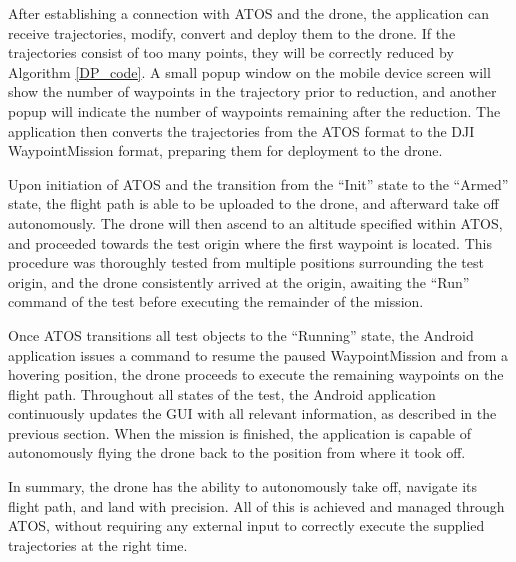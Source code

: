 After establishing a connection with ATOS and the drone, the application can receive trajectories, modify, convert and deploy them to the drone. If the trajectories consist of too many points, they will be correctly reduced by Algorithm \ref{DP_code}. A small popup window on the mobile device screen will show the number of waypoints in the trajectory prior to reduction, and another popup will indicate the number of waypoints remaining after the reduction. The application then converts the trajectories from the ATOS format to the DJI WaypointMission format, preparing them for deployment to the drone. 
\newline

Upon initiation of ATOS and the transition from the ``Init'' state to the ``Armed'' state, the flight path is able to be uploaded to the drone, and afterward take off autonomously. The drone will then ascend to an altitude specified within ATOS, and proceeded towards the test origin where the first waypoint is located. This procedure was thoroughly tested from multiple positions surrounding the test origin, and the drone consistently arrived at the origin, awaiting the ``Run'' command of the test before executing the remainder of the mission.
\newline

Once ATOS transitions all test objects to the ``Running'' state, the Android application issues a command to resume the paused WaypointMission and from a hovering position, the drone proceeds to execute the remaining waypoints on the  flight path. Throughout all states of the test, the Android application continuously updates the GUI with all relevant information, as described in the previous section. When the mission is finished, the application is capable of autonomously flying the drone back to the position from where it took off.   
\newline  

In summary, the drone has the ability to autonomously take off, navigate its flight path, and land with precision. All of this is achieved and managed through ATOS, without requiring any external input to correctly execute the supplied trajectories at the right time. 

